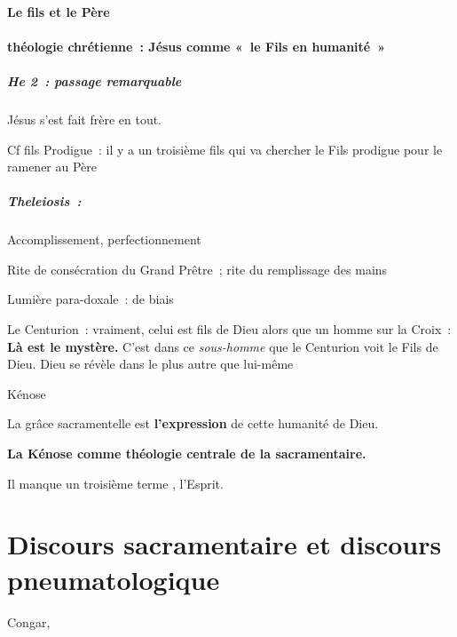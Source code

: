 \hypertarget{le-fils-et-le-puxe8re}{%
\paragraph{Le fils et le Père}\label{le-fils-et-le-puxe8re}}

\hypertarget{c.-thuxe9ologie-chruxe9tienne-juxe9sus-comme-le-fils-en-humanituxe9}{%
\paragraph{théologie chrétienne~: Jésus comme «~le Fils en
humanité~»}\label{c.-thuxe9ologie-chruxe9tienne-juxe9sus-comme-le-fils-en-humanituxe9}}

\hypertarget{he-2-passage-remarquable}{%
\subparagraph{\texorpdfstring{He 2~: passage remarquable
}{He 2~: passage remarquable }}\label{he-2-passage-remarquable}}

Jésus s'est fait frère en tout.

Cf fils Prodigue~: il y a un troisième fils qui va chercher le Fils
prodigue pour le ramener au Père

\hypertarget{theleiosis}{%
\subparagraph{\texorpdfstring{Theleiosis~:
}{Theleiosis~: }}\label{theleiosis}}

Accomplissement, perfectionnement

Rite de consécration du Grand Prêtre~; rite du remplissage des mains

Lumière para-doxale~: de biais

Le Centurion~: vraiment, celui est fils de Dieu alors que un homme sur
la Croix~: \textbf{Là est le mystère.} C'est dans ce \emph{sous-homme}
que le Centurion voit le Fils de Dieu. Dieu se révèle dans le plus autre
que lui-même

Kénose

La grâce sacramentelle est \textbf{l'expression} de cette humanité de
Dieu.

\textbf{La Kénose comme théologie centrale de la sacramentaire.}

Il manque un troisième terme , l'Esprit.

\hypertarget{discours-sacramentaire-et-discours-pneumatologique}{%
\section{Discours sacramentaire et discours
pneumatologique}\label{discours-sacramentaire-et-discours-pneumatologique}}

Congar,

